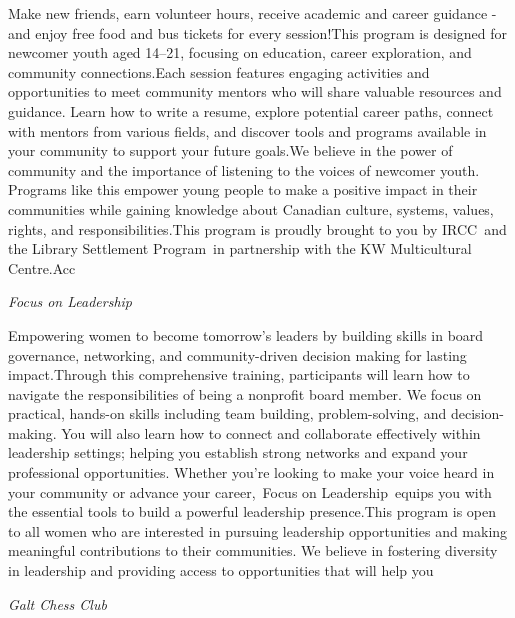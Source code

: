 \documentclass[letterpaper, 10pt]{article}
\newcommand{\subtitle}[1]{\textit{\large #1}\vspace{0.5em}}
\newcommand{\articlecontent}[1]{\small #1\vspace{1em}}
\begin{document}
\begin{multicols}{2}
{Make new friends, earn volunteer hours, receive academic and career guidance - and enjoy free food and bus tickets for every session!This program is designed for newcomer youth aged 14–21, focusing on education, career exploration, and community connections.Each session features engaging activities and opportunities to meet community mentors who will share valuable resources and guidance. Learn how to write a resume, explore potential career paths, connect with mentors from various fields, and discover tools and programs available in your community to support your future goals.We believe in the power of community and the importance of listening to the voices of newcomer youth. Programs like this empower young people to make a positive impact in their communities while gaining knowledge about Canadian culture, systems, values, rights, and responsibilities.This program is proudly brought to you by IRCC and the Library Settlement Program in partnership with the KW Multicultural Centre.Acc
}
\vspace{10px}

\subtitle{Focus on Leadership}

\articlecontent{

\qrcode[height=1.5cm]{https://ideaexchange.libnet.info/event/12494434}
\vspace{10px}

Empowering women to become tomorrow’s leaders by building skills in board governance, networking, and community-driven decision making for lasting impact.Through this comprehensive training, participants will learn how to navigate the responsibilities of being a nonprofit board member. We focus on practical, hands-on skills including team building, problem-solving, and decision-making. You will also learn how to connect and collaborate effectively within leadership settings; helping you establish strong networks and expand your professional opportunities. Whether you're looking to make your voice heard in your community or advance your career, Focus on Leadership equips you with the essential tools to build a powerful leadership presence.This program is open to all women who are interested in pursuing leadership opportunities and making meaningful contributions to their communities. We believe in fostering diversity in leadership and providing access to opportunities that will help you
}
\vspace{10px}

\subtitle{Galt Chess Club}

\articlecontent{

}
\end{multicols}
\end{document}
